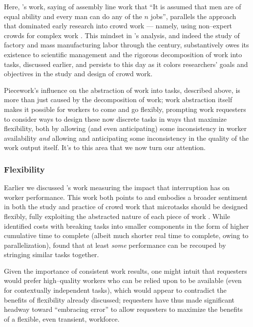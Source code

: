 \documentclass{sigchi}
\begin{document}
Here, \citeauthor{hu1961parallel}'s work,
saying of assembly line work that
``It is assumed that men are of equal ability and every man can do any of the $n$ jobs'',
parallels the approach that dominated early research into crowd work
--- namely, using non--expert crowds for complex work
\cite{hu1961parallel}.
This mindset in \citeauthor{hu1961parallel}'s analysis,
and indeed the study of factory and mass manufacturing labor through the  century,
substantively owes its existence to scientific management
and the rigorous decomposition of work into tasks, discussed earlier,
and persists to this day as it colors
researchers' goals and objectives in the study and design of crowd work.

Piecework's influence on the abstraction of work into tasks,
described above, is more than just caused by the decomposition of work;
work abstraction itself makes it possible for workers to come and go flexibly,
prompting work requesters to consider ways to design these now discrete tasks in ways that
maximize flexibility, both by allowing (and even anticipating) some inconsistency in worker availability
\textit{and} allowing and anticipating some inconsistency in the quality of the work output itself.
It's to this area that we now turn our attention.

\subsubsection{Flexibility}\label{sec:flexibility}
Earlier we discussed \citeauthor{cheng2015break}'s work
measuring the impact that interruption has on worker performance.
This work both points to and embodies a broader sentiment in
both the study and practice
of crowd work that microtasks should be designed flexibly,
fully exploiting the abstracted nature of each piece of work
\cite{interruptionIqbal,delayAndOrderLasecki,vaish2014low}.
While \citeauthor{cheng2015break} identified costs with breaking tasks into smaller components
in the form of higher cumulative time to complete
(albeit much shorter real time to complete, owing to parallelization),
\citeauthor{delayAndOrderLasecki} found that at least \textit{some} performance can be recouped by stringing 
similar tasks together.


Given the importance of consistent work results, one might intuit that
requesters would prefer high--quality workers who can be relied upon to be available
(even for contextually independent tasks),
which would appear to contradict the benefits of flexibility already discussed;
requesters have thus made significant headway toward
``embracing error'' to allow requesters to maximize the benefits of a flexible,
even transient,
workforce.
\end{document}
